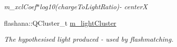 \begin{DoxyCompactItemize}
\begin{DoxyCompactList}\small\item\em m\+\_\+xcl\+Coef$\ast$log10(charge\+To\+Light\+Ratio)-\/ centerX \end{DoxyCompactList}\item 
flashana\+::\+Q\+Cluster\+\_\+t \hyperlink{classflashmatch_1_1FlashMatchingTool_1_1SliceCandidate_a54f3af045d322b457a94b52b4e7799af}{m\+\_\+light\+Cluster}\hypertarget{classflashmatch_1_1FlashMatchingTool_1_1SliceCandidate_a54f3af045d322b457a94b52b4e7799af}{}\label{classflashmatch_1_1FlashMatchingTool_1_1SliceCandidate_a54f3af045d322b457a94b52b4e7799af}

\begin{DoxyCompactList}\small\item\em The hypothesised light produced -\/ used by flashmatching. \end{DoxyCompactList}\end{DoxyCompactItemize}
